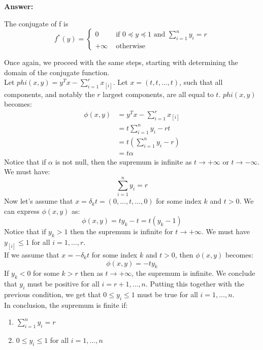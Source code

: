 \documentclass[11pt,a4paper]{article}
\newenvironment{solution}{
  \par\noindent\textbf{Answer:}\vspace{0.3em}
}{\vspace{1em}}
\begin{document}
\begin{enumerate}
    \begin{solution}
        The conjugate of f is
        \[
            f^* (y) = \begin{cases}
                0 &\text{ if } 0 \preceq y \preceq 1 \text{ and } \sum_{i=1}^n y_i = r\\
                +\infty &\text{ otherwise}
            \end{cases}
        \]

        Once again, we proceed with the same steps, starting with determining the domain of the conjugate function.\\
        Let $phi(x, y) = y^T x - \sum_{i=1}^r x_{[i]}$. Let $x = (t, t, \dots, t)$, such that all components, and notably the $r$ largest components, are all equal to $t$. $phi(x, y)$ becomes:
        \begin{align*}
            \phi(x, y)
            &= y^T x - \sum_{i=1}^r x_{[i]}\\
            &= t \sum_{i=1}^n y_i - rt\\
            &= t(\sum_{i=1}^n y_i - r)\\
            &= t \alpha
        \end{align*}
        Notice that if $\alpha$ is not null, then the supremum is infinite as $t \to +\infty$ or $t \to -\infty$. We must have:
        \[
            \sum_{i=1}^n y_i = r
        \]
        Now let's assume that $x = \delta_k t = (0, \dots, t, \dots, 0)$ for some index $k$ and $t > 0$. We can express $\phi(x, y)$ as:
        \[
            \phi(x, y) = t y_k - t = t (y_k - 1)
        \]
        Notice that if $y_k > 1$ then the supremum is infinite for $t \to +\infty$. We must have $y_{[i]} \leq 1$ for all $i=1, \dots, r$.\\
        If we assume that $x = -\delta_k t$ for some index $k$ and $t > 0$, then $\phi(x, y)$ becomes:
        \[
            \phi(x, y) = -t y_k
        \]
        If $y_k < 0$ for some $k > r$ then as $t \to +\infty$, the supremum is infinite. We conclude that $y_i$ must be positive for all $i = r+1, \dots, n$. Putting this together with the previous condition, we get that $0 \leq y_i \leq 1$ must be true for all $i = 1, \dots, n$.\\
        
        In conclusion, the supremum is finite if:
        \begin{enumerate}
            \item $\sum_{i=1}^n y_i = r$
            \item $0 \leq y_i \leq 1$ for all $i = 1, \dots, n$
        \end{enumerate}


\end{solution}
\end{enumerate}
\end{document}
